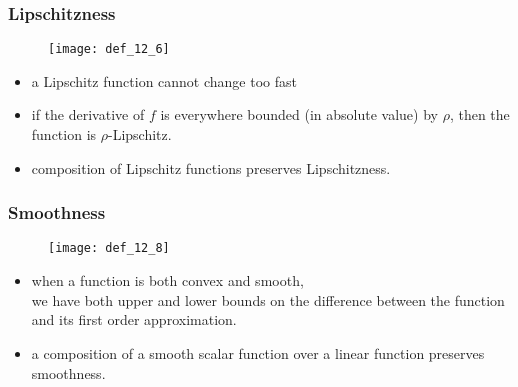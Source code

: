 \begin{frame}
\frametitle{Lipschitzness}
\begin{figure}
    \centering
    \texttt{[image: def\_12\_6]}
\end{figure}

\begin{itemize}
    \item a Lipschitz function cannot change too fast
    \item if the derivative of $f$ is everywhere bounded (in absolute value) by $\rho$,
        then the function is $\rho$-Lipschitz.
    \item composition of Lipschitz functions preserves Lipschitzness.
\end{itemize}

\end{frame}


\begin{frame}
\frametitle{Smoothness}
\begin{figure}
    \centering
    \texttt{[image: def\_12\_8]}
\end{figure}

\begin{itemize}
    \item when a function is both convex and smooth,\\
        we have both upper and lower bounds on the difference between
        the function and its first order approximation.
    \item a composition of a smooth scalar function over a linear function preserves smoothness.
\end{itemize}

\end{frame}
